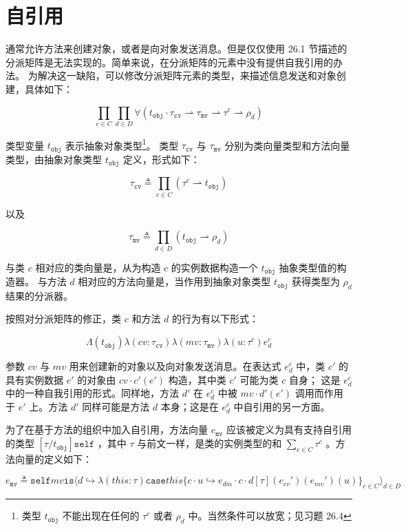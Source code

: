 \section{自引用}

通常允许方法来创建对象，或者是向对象发送消息。但是仅仅使用 26.1 节描述的分派矩阵是无法实现的。简单来说，在分派矩阵的元素中没有提供自我引用的办法。
为解决这一缺陷，可以修改分派矩阵元素的类型，来描述信息发送和对象创建，具体如下：

$$ \prod_{c \in C} \prod_{d \in D} \forall (t_{\mathtt{obj}} \cdot \tau_{\mathtt{cv}} \rightharpoonup \tau_{\mathtt{mv}} \rightharpoonup \tau^{c} \rightharpoonup \rho_{d})$$

类型变量 $t_{\mathtt{obj}}$ 表示抽象对象类型\footnote[2]{类型 $t_{\mathtt{obj}}$ 不能出现在任何的 $\tau^{c}$ 或者 $\rho_{d}$ 中。当然条件可以放宽；见习题 26.4}。
类型 $\tau_{\mathtt{cv}}$ 与 $\tau_{\mathtt{mv}}$ 分别为类向量类型和方法向量类型，由抽象对象类型 $t_{\mathtt{obj}}$ 定义，形式如下：

$$ \tau_{\mathtt{cv}} \triangleq \prod_{c \in C}(\tau^{c} \rightharpoonup t_{\mathtt{obj}}) $$

以及

$$ \tau_{\mathtt{mv}} \triangleq \prod_{d \in D}(t_{\mathtt{obj}} \rightharpoonup \rho_{d}) $$

与类 $c$ 相对应的类向量是，从为构造 $c$ 的实例数据构造一个 $t_{\mathtt{obj}}$ 抽象类型值的构造器。
与方法 $d$ 相对应的方法向量是，当作用到抽象对象类型 $t_{\mathtt{obj}}$ 获得类型为 $\rho_{d}$ 结果的分派器。

按照对分派矩阵的修正，类 $c$ 和方法 $d$ 的行为有以下形式：

$$ \Lambda(t_{\mathtt{obj}})\lambda(cv : \tau_{\mathtt{cv}}) \lambda (mv : \tau_{\mathtt{mv}}) \lambda (u : \tau^{c})e^{c}_{d}$$

参数 $cv$ 与 $mv$ 用来创建新的对象以及向对象发送消息。在表达式 $e^{c}_{d}$ 中，类 $c'$ 的具有实例数据 $e'$ 的对象由 $ cv \cdot c' (e') $ 构造，其中类 $c'$ 可能为类 $c$ 自身；
这是 $e^{c}_{d}$ 中的一种自我引用的形式。同样地，方法 $d'$ 在 $e^{c}_{d}$ 中被 $ mv \cdot d'(e') $ 调用而作用于 $e'$ 上。方法 $d'$ 同样可能是方法 $d$ 本身；这是在 $e^{c}_{d}$ 中自引用的另一方面。

为了在基于方法的组织中加入自引用，方法向量 $e_{\mathtt{mv}}$ 应该被定义为具有支持自引用的类型 $[\tau/t_{\mathtt{obj}}] {\mathtt{self}}$ ，其中 $\tau$ 与前文一样，是类的实例类型的和 $\sum_{c \in C} \tau^{c}$ 。方法向量的定义如下：

$$ e_{\mathtt{mv}} \triangleq {\mathtt{self}} mv {\mathtt{is}} \langle d \hookrightarrow \lambda(this : \tau) {\mathtt{case}} this \{ c \cdot u \hookrightarrow e_{dm} \cdot c \cdot d[\tau](e_{cv}')(e_{mv}')(u)\}_{c \in C} \rangle_{d \in D} $$


